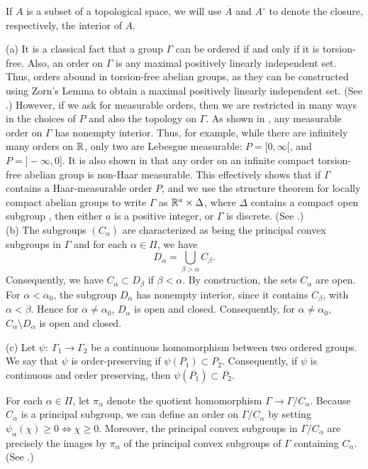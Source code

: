 \documentclass[12pt,leqno]{article}
\def\R{\Bbb R}
\begin{document}
If $A$ is
a subset of a topological space, we will use $\overline{A}$ and
$A^\circ$ to denote the closure, respectively, the interior
of $A$. 

\begin{rem}
{\rm  
(a)  It is a classical fact that a group $\Gamma$ can be ordered if
and only if it is torsion-free.
Also, an order on $\Gamma$ is 
any maximal positively linearly independent set.  
Thus, orders abound in torsion-free abelian groups, as
they can be constructed using Zorn's Lemma to obtain a maximal positively
linearly independent set.  
(See \cite[Section 2]{hk}.)  
However, if we ask for 
measurable orders, then we are 
restricted in many ways in the choices 
of $P$ and also the topology on $\Gamma$.  As shown in \cite{hk}, 
any measurable order on $\Gamma$ has nonempty interior.
Thus, for example, while there are infinitely many orders
on $\R$, only two are Lebesgue measurable:  
$P=[0,\infty [$, and
$P=]-\infty,0]$.  
It is also shown in \cite[Theorem (3.2)]{hk} that any
order on an infinite compact torsion-free abelian group
is non-Haar measurable.  This effectively shows
that if $\Gamma$ contains a Haar-measurable order $P$,
and we use the structure theorem for locally compact abelian
groups to write $\Gamma$ as $\R^a\times \Delta$, where 
$\Delta$ contains a compact open subgroup
\cite[Theorem (24.30)]{hr1}, then
either $a$ is a positive integer, or $\Gamma$ is
discrete.  (See \cite{ams}.)  \\
(b)  The subgroups $(C_\alpha)$ are characterized as being the principal
convex subgroups in $\Gamma$ and for each $\alpha\in \Pi$,
we have 
$$D_\alpha=\bigcup_{\beta>\alpha}C_\beta.$$
Consequently, we have $C_\alpha\subset D_\beta$ if 
$\beta <\alpha$.   
By construction, the sets $C_\alpha$ are open.  For $\alpha< \alpha_0$, the subgroup $D_\alpha$ has
 nonempty interior, since it contains $C_\beta$, with
$\alpha<\beta$.  Hence for $\alpha\neq \alpha_0$,
$D_\alpha$ is open and closed.  Consequently, for 
$\alpha\neq \alpha_0$,
$C_\alpha\setminus D_\alpha$ is open and closed.

(c)  Let $\psi:\ \Gamma_1\rightarrow \Gamma_2$ be a continuous 
homomorphism between two ordered groups.  We say that
$\psi$ is order-preserving if $\psi(P_1)\subset P_2$.  
Consequently, if 
$\psi$ is continuous and order preserving, then
$\psi(\overline{P_1})\subset \overline{P_2}$.

For each $\alpha\in \Pi$, let $\pi_\alpha$ denote the
quotient homomorphism $\Gamma\rightarrow \Gamma/C_\alpha$. 
Because $C_\alpha$ is a principal subgroup, we can define an order
on $ \Gamma/C_\alpha$ by setting $\psi_\alpha(\chi)\geq 0\Longleftrightarrow
\chi\geq 0$.  Moreover, the principal convex subgroups
in $\Gamma/C_\alpha$ are precisely the images by 
$\pi_\alpha$ of the principal convex subgroups of 
$\Gamma$ containing $C_\alpha$.  (See \cite[Section 2]{ams}.)




}
\label{remarkstructureorder}
\end{rem}
\end{document}
